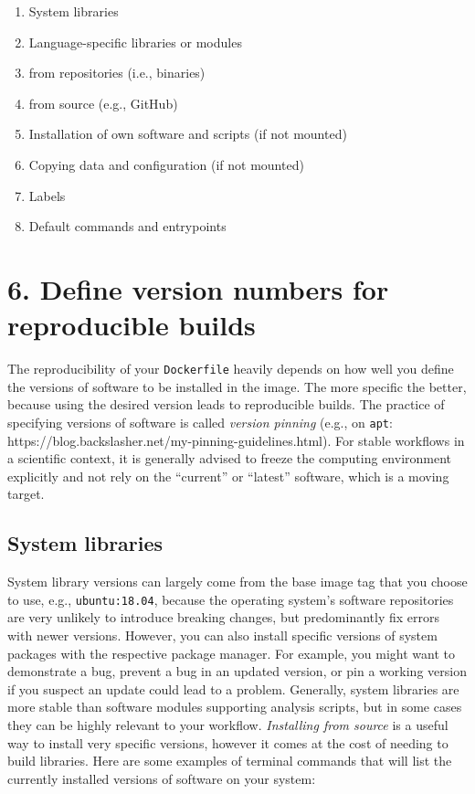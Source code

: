 \documentclass[10pt,letterpaper]{article}
\providecommand{\tightlist}{%
  \setlength{\itemsep}{0pt}\setlength{\parskip}{0pt}}
\begin{document}
\begin{enumerate}
\def\labelenumi{\arabic{enumi}.}
\tightlist
\item
  System libraries
\item
  Language-specific libraries or modules
\item
  from repositories (i.e., binaries)
\item
  from source (e.g., GitHub)
\item
  Installation of own software and scripts (if not mounted)
\item
  Copying data and configuration (if not mounted)
\item
  Labels
\item
  Default commands and entrypoints
\end{enumerate}

\hypertarget{define-version-numbers-for-reproducible-builds}{%
\section*{6. Define version numbers for reproducible
builds}\label{define-version-numbers-for-reproducible-builds}}

  \label{rule:pinning} 

The reproducibility of your \texttt{Dockerfile} heavily depends on how
well you define the versions of software to be installed in the image.
The more specific the better, because using the desired version leads to
reproducible builds. The practice of specifying versions of software is
called \emph{version pinning} (e.g., on \texttt{apt}:
https://blog.backslasher.net/my-pinning-guidelines.html). For stable
workflows in a scientific context, it is generally advised to freeze the
computing environment explicitly and not rely on the ``current'' or
``latest'' software, which is a moving target.

\hypertarget{system-libraries}{%
\subsection{System libraries}\label{system-libraries}}

System library versions can largely come from the base image tag that
you choose to use, e.g., \texttt{ubuntu:18.04}, because the operating
system's software repositories are very unlikely to introduce breaking
changes, but predominantly fix errors with newer versions. However, you
can also install specific versions of system packages with the
respective package manager. For example, you might want to demonstrate a
bug, prevent a bug in an updated version, or pin a working version if
you suspect an update could lead to a problem. Generally, system
libraries are more stable than software modules supporting analysis
scripts, but in some cases they can be highly relevant to your workflow.
\emph{Installing from source} is a useful way to install very specific
versions, however it comes at the cost of needing to build libraries.
Here are some examples of terminal commands that will list the currently
installed versions of software on your system:
\end{document}
